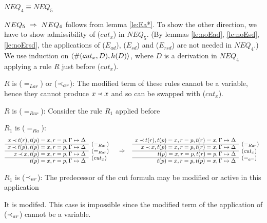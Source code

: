 \begin{LEMMA}\label{le:nocutx}
   $NEQ_4 \equiv NEQ_5$
\end{LEMMA}
\begin{PROOF}
   $NEQ_5\ \mathrel\Rightarrow\ NEQ_4$ follows from lemma
   \ref{le:Ea*}. To show the other direction, we have to show admissibility
   of ($cut_x$) in $NEQ_5$. 
(By lemmas \ref{le:noEad}, \ref{le:noEsd}, \ref{le:noErsd}, the applications
of ($E_{ad}$), ($E_{sd}$) and ($E_{rsd}$) are not needed in $NEQ_4$.)
We use induction on $\langle\#(cut_x,D),h(D)\rangle$, where
   $D$ is a derivation in $NEQ_4$ applying a rule $R$ just before ($cut_x$).
\begin{LS}
\item $R$ is ($=_{Lar}$) or ($\mathbin{\prec}_{ar}$): The modified term of these rules cannot be 
a variable, hence they cannot produce $x\mathbin{\prec} x$ and so can be swapped with ($cut_x$).
%
\item $R$ is ($=_{Rar}$):
Consider the rule $R_1$ applied before
\begin{LSA}
\item $R_1$ is ($=_{Ra}$):
{\footnotesize \[ \begin{array}{rl}
x\Incl t(r), t(p)=x, r=p,\GSD  \\ \cline{1-1}
x\Incl t(p), t(p)=x, r=p, \GSD & \rabove{(=_{Rar})} \\ \cline{1-1}
x\Incl x,  t(p)=x, r=p, \GSD & \rabove{(=_{Rar})} \\ \cline{1-1}
           t(p)=x, r=p,\GSD & \rabove{(cut_x)} \end{array}  \conv 
 \begin{array}{rl}
x\Incl t(r), t(p)=x, r=p, t(r)=x,\GSD  \\ \cline{1-1}
x\Incl x, t(p)=x, r=p, t(r)=x,\GSD & \rabove{(=_{Rar})} \\ \cline{1-1}
   t(p)=x, r=p, t(r)=p,\GSD & \rabove{(cut_x)} \\ \cline{1-1}
           t(p)=x, r=p, t(p)=x, \GSD & \rabove{(=_{a=})} \end{array} \] }
\item $R_1$ is ($\mathbin{\prec}_{ar}$):
The predecessor of the cut formula may be modified or active in this application
\begin{LSB}
 \item\label{it:modIncl} It is modifed. This case is impossible since the modified
term of the application of ($\mathbin{\prec}_{ar}$) cannot be a variable.

\end{LSB}
\end{LSA}
\end{LS}
\end{PROOF}
